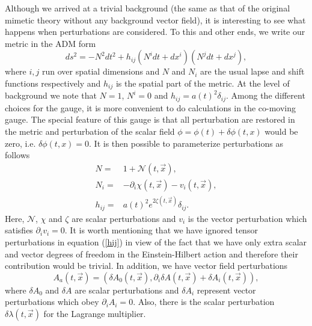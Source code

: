 \documentclass[%
 reprint,
 amsmath,amssymb,
 aps,
]{revtex4-1}
\begin{document}
Although we arrived at a trivial background (the same as that of the original mimetic theory without any background vector field), it is interesting to see what happens when perturbations are considered. To this and other ends, we write our metric in the ADM form \cite{Maldacena:2002vr}
\begin{equation}
ds^2=-N^2 dt^2+h_{ij}(N^i dt +dx^i)(N^j dt +dx^j),
\end{equation}
where $i,j$ run over spatial dimensions and $N$ and $N_i$ are the usual lapse and shift functions respectively and $h_{ij}$ is the spatial part of the metric. At the level of background we note that $N=1$, $N^i=0$ and $h_{ij}=a(t)^2 \delta_{ij}$. Among the different choices  for the gauge, it is more convenient to do calculations in the co-moving gauge. The special feature of this gauge is that all perturbation are restored in the metric and  perturbation of the scalar field $\phi=\phi(t)+\delta\phi(t,x)$ would be zero, i.e. $\delta\phi(t,x)=0$. It is then possible to parameterize perturbations as follows
\begin{eqnarray}
N=&1+\mathcal{N}(t,\vec{x}),\\
N_i=&-\partial_i \chi(t,\vec{x}) - v_i(t,\vec{x}),\\
h_{ij}=&a(t)^2 e^{2 \zeta(t,\vec{x})} \delta_{ij}. \label{hij}
\end{eqnarray}
Here, $\mathcal{N}$, $\chi$ and $\zeta$ are scalar perturbations and $v_i$ is the vector perturbation which satisfies $\partial_i v_i=0$. It is worth mentioning that we have ignored tensor perturbations in equation (\ref{hij}) in view of the fact that we have only extra scalar and vector degrees of freedom in the Einstein-Hilbert action and therefore their contribution would be trivial. In addition, we have vector field perturbations
\begin{equation}
A_a(t,\vec{x})=\left(\delta A_0(t,\vec{x}),\partial_i\delta A(t,\vec{x})+\delta A_i(t,\vec{x})\right),
\end{equation}
where $\delta A_0$ and $\delta A$ are scalar perturbations and $\delta A_i$ represent vector perturbations which obey $\partial_i A_i=0$. Also, there is the scalar perturbation $\delta\lambda(t,\vec{x})$ for the Lagrange multiplier.
\end{document}
